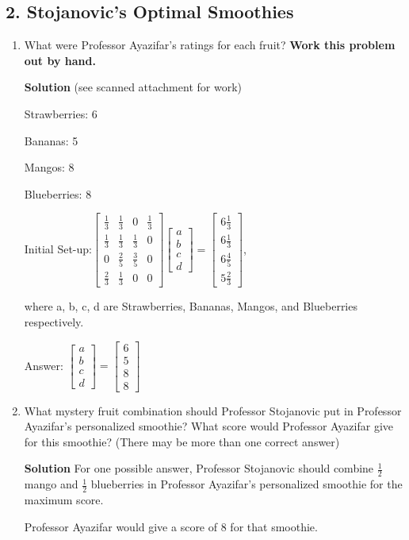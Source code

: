 \documentclass{article}\usepackage{amsmath,amssymb,amsthm,tikz,tkz-graph,color,chngpage,soul,hyperref,csquotes,graphicx,floatrow}\newcommand*{\QEDB}{\hfill\ensuremath{\square}}\newtheorem*{prop}{Proposition}\renewcommand{\theenumi}{\alph{enumi}}\usepackage[shortlabels]{enumitem}\usepackage[nobreak=true]{mdframed}\usetikzlibrary{matrix,calc}\MakeOuterQuote{"}\usepackage[margin=1in]{geometry} \newtheorem{theorem}{Theorem}
\begin{document}
\subsection*{2. Stojanovic's Optimal Smoothies}
\begin{enumerate}
\item What were Professor Ayazifar's ratings for each fruit?  \textbf{Work this problem out by hand.}
\begin{mdframed}
\textbf{Solution} (see scanned attachment for work)

Strawberries: 6

Bananas: 5

Mangos: 8

Blueberries: 8

Initial Set-up:$\begin{bmatrix} \frac{1}{3} & \frac{1}{3} & 0 & \frac{1}{3} \\ \frac{1}{3} & \frac{1}{3} & \frac{1}{3} & 0 \\ 0 & \frac{2}{5} & \frac{3}{5} & 0 \\ \frac{2}{3} & \frac{1}{3} & 0 & 0 \end{bmatrix} \begin{bmatrix} a\\ b\\c\\d \end{bmatrix} = \begin{bmatrix} 6\frac{1}{3}\\ 6\frac{1}{3}\\6\frac{4}{5}\\5\frac{2}{3} \end{bmatrix}$,

where a, b, c, d are Strawberries, Bananas, Mangos, and Blueberries respectively.

Answer: $\begin{bmatrix} a\\b\\c\\d \end{bmatrix} = \begin{bmatrix} 6\\5\\8\\8 \end{bmatrix}$%
\end{mdframed}
\item What mystery fruit combination should Professor Stojanovic put in Professor Ayazifar's personalized smoothie? What score would Professor Ayazifar give for this smoothie? (There may be more than one correct answer)
\begin{mdframed}
\textbf{Solution} For one possible answer, Professor Stojanovic should combine $\frac{1}{2}$ mango and $\frac{1}{2}$ blueberries in Professor Ayazifar's personalized smoothie for the maximum score.

Professor Ayazifar would give a score of 8 for that smoothie.%
\end{mdframed}
\end{enumerate}
\clearpage
\end{document}
